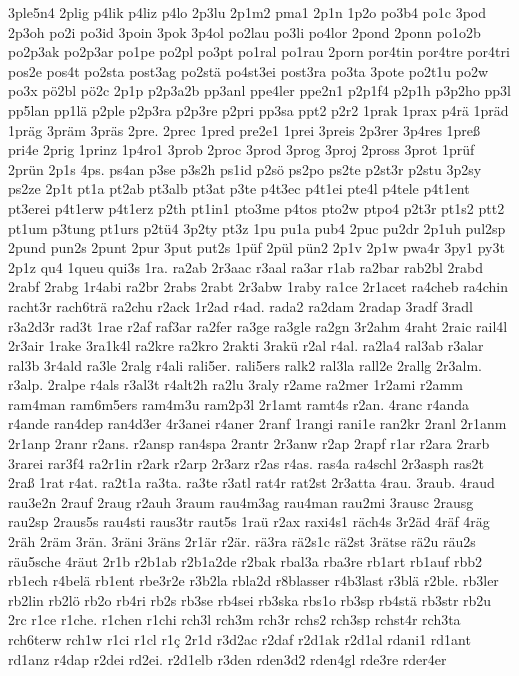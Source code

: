 {3ple5n4
2plig
p4lik
p4liz
p4lo
2p3lu
2p1m2
pma1
2p1n
1p2o
po3b4
po1c
3pod
2p3oh
po2i
po3id
3poin
3pok
3p4ol
po2lau
po3li
po4lor
2pond
2ponn
po1o2b
po2p3ak
po2p3ar
po1pe
po2pl
po3pt
po1ral
po1rau
2porn
por4tin
por4tre
por4tri
pos2e
pos4t
po2sta
post3ag
po2stä
po4st3ei
post3ra
po3ta
3pote
po2t1u
po2w
po3x
pö2bl
pö2c
2p1p
p2p3a2b
pp3anl
ppe4ler
ppe2n1
p2p1f4
p2p1h
p3p2ho
pp3l
pp5lan
pp1lä
p2ple
p2p3ra
p2p3re
p2pri
pp3sa
ppt2
p2r2
1prak
1prax
p4rä
1präd
1präg
3präm
3präs
2pre.
2prec
1pred
pre2e1
1prei
3preis
2p3rer
3p4res
1preß
pri4e
2prig
1prinz
1p4ro1
3prob
2proc
3prod
3prog
3proj
2pross
3prot
1prüf
2prün
2p1s
4ps.
ps4an
p3se
p3s2h
ps1id
p2sö
ps2po
ps2te
p2st3r
p2stu
3p2sy
ps2ze
2p1t
pt1a
pt2ab
pt3alb
pt3at
p3te
p4t3ec
p4t1ei
pte4l
p4tele
p4t1ent
pt3erei
p4t1erw
p4t1erz
p2th
pt1in1
pto3me
p4tos
pto2w
ptpo4
p2t3r
pt1s2
ptt2
pt1um
p3tung
pt1urs
p2tü4
3p2ty
pt3z
1pu
pu1a
pub4
2puc
pu2dr
2p1uh
pul2sp
2pund
pun2s
2punt
2pur
3put
put2s
1püf
2pül
pün2
2p1v
2p1w
pwa4r
3py1
py3t
2p1z
qu4
1queu
qui3s
1ra.
ra2ab
2r3aac
r3aal
ra3ar
r1ab
ra2bar
rab2bl
2rabd
2rabf
2rabg
1r4abi
ra2br
2rabs
2rabt
2r3abw
1raby
ra1ce
2r1acet
ra4cheb
ra4chin
racht3r
rach6trä
ra2chu
r2ack
1r2ad
r4ad.
rada2
ra2dam
2radap
3radf
3radl
r3a2d3r
rad3t
1rae
r2af
raf3ar
ra2fer
ra3ge
ra3gle
ra2gn
3r2ahm
4raht
2raic
rail4l
2r3air
1rake
3ra1k4l
ra2kre
ra2kro
2rakti
3rakü
r2al
r4al.
ra2la4
ral3ab
r3alar
ral3b
3r4ald
ra3le
2ralg
r4ali
rali5er.
rali5ers
ralk2
ral3la
rall2e
2rallg
2r3alm.
r3alp.
2ralpe
r4als
r3al3t
r4alt2h
ra2lu
3raly
r2ame
ra2mer
1r2ami
r2amm
ram4man
ram6m5ers
ram4m3u
ram2p3l
2r1amt
ramt4s
r2an.
4ranc
r4anda
r4ande
ran4dep
ran4d3er
4r3anei
r4aner
2ranf
1rangi
rani1e
ran2kr
2ranl
2r1anm
2r1anp
2ranr
r2ans.
r2ansp
ran4spa
2rantr
2r3anw
r2ap
2rapf
r1ar
r2ara
2rarb
3rarei
rar3f4
ra2r1in
r2ark
r2arp
2r3arz
r2as
r4as.
ras4a
ra4schl
2r3asph
ras2t
2raß
1rat
r4at.
ra2t1a
ra3ta.
ra3te
r3atl
rat4r
rat2st
2r3atta
4rau.
3raub.
4raud
rau3e2n
2rauf
2raug
r2auh
3raum
rau4m3ag
rau4man
rau2mi
3rausc
2rausg
rau2sp
2raus5s
rau4sti
raus3tr
raut5s
1raü
r2ax
raxi4s1
räch4s
3r2äd
4räf
4räg
2räh
2räm
3rän.
3räni
3räns
2r1är
r2är.
rä3ra
rä2s1c
rä2st
3rätse
rä2u
räu2s
räu5sche
4räut
2r1b
r2b1ab
r2b1a2de
r2bak
rbal3a
rba3re
rb1art
rb1auf
rbb2
rb1ech
r4belä
rb1ent
rbe3r2e
r3b2la
rbla2d
r8blasser
r4b3last
r3blä
r2ble.
rb3ler
rb2lin
rb2lö
rb2o
rb4ri
rb2s
rb3se
rb4sei
rb3ska
rbs1o
rb3sp
rb4stä
rb3str
rb2u
2rc
r1ce
r1che.
r1chen
r1chi
rch3l
rch3m
rch3r
rchs2
rch3sp
rchst4r
rch3ta
rch6terw
rch1w
r1ci
r1cl
r1ç
2r1d
r3d2ac
r2daf
r2d1ak
r2d1al
rdani1
rd1ant
rd1anz
r4dap
r2dei
rd2ei.
r2d1elb
r3den
rden3d2
rden4gl
rde3re
rder4er
}
